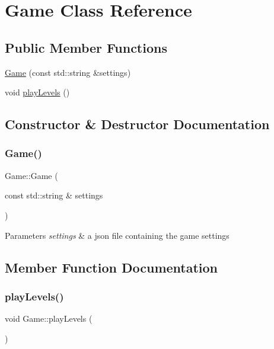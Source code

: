 \hypertarget{classGame}{}\section{Game Class Reference}
\label{classGame}
\subsection*{Public Member Functions}
\begin{DoxyCompactItemize}
\item 
\hyperlink{classGame_ae84079995ee22675be0adfbaa54940d9}{Game} (const std\+::string \&settings)
\item 
void \hyperlink{classGame_a36587df95a3343658a2d02674050abd7}{play\+Levels} ()
\end{DoxyCompactItemize}


\subsection{Constructor \& Destructor Documentation}
\mbox{\label{classGame_ae84079995ee22675be0adfbaa54940d9}} 
\subsubsection{\texorpdfstring{Game()}{Game()}}
{\footnotesize\ttfamily Game\+::\+Game (\begin{DoxyParamCaption}\item[{const std\+::string \&}]{settings }\end{DoxyParamCaption})\hspace{0.3cm}{\ttfamily [explicit]}}


\begin{DoxyParams}{Parameters}
{\em settings} & a json file containing the game settings \\
\hline
\end{DoxyParams}


\subsection{Member Function Documentation}
\mbox{\label{classGame_a36587df95a3343658a2d02674050abd7}} 
\subsubsection{\texorpdfstring{play\+Levels()}{playLevels()}}
{\footnotesize\ttfamily void Game\+::play\+Levels (\begin{DoxyParamCaption}{ }\end{DoxyParamCaption})}


